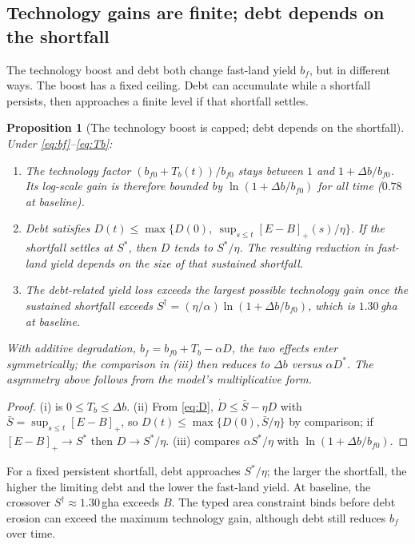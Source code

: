 \documentclass[preprint,12pt,authoryear]{elsarticle}
\newtheorem{proposition}{Proposition}
\newcommand{\pos}[1]{\left[#1\right]_+}
\begin{document}
\subsection{Technology gains are finite; debt depends on the shortfall}\label{sec:bounded}

The technology boost and debt both change fast-land yield $b_f$, but in different ways. The boost has a fixed ceiling. Debt can accumulate while a shortfall persists, then approaches a finite level if that shortfall settles.

\begin{proposition}[The technology boost is capped; debt depends on the shortfall]\label{prop:bounded}
Under \eqref{eq:bf}--\eqref{eq:Tb}:
\begin{enumerate}[label=(\roman*)]
\item The technology factor $(b_{f0}+T_b(t))/b_{f0}$ stays between $1$ and $1+\Delta b/b_{f0}$. Its log-scale gain is therefore bounded by $\ln(1+\Delta b/b_{f0})$ for all time ($0.78$ at baseline).
\item Debt satisfies $D(t)\le\max\{D(0),\ \sup_{s\le t}\pos{E-B}(s)/\eta\}$. If the shortfall settles at $S^*$, then $D$ tends to $S^*/\eta$. The resulting reduction in fast-land yield depends on the size of that sustained shortfall.
\item The debt-related yield loss exceeds the largest possible technology gain once the sustained shortfall exceeds $S^\dagger=(\eta/\alpha)\ln(1+\Delta b/b_{f0})$, which is $1.30$\,gha at baseline.
\end{enumerate}
With additive degradation, $b_f=b_{f0}+T_b-\alpha D$, the two effects enter symmetrically; the comparison in (iii) then reduces to $\Delta b$ versus $\alpha D^*$. The asymmetry above follows from the model's multiplicative form.
\end{proposition}

\begin{proof}
(i) is $0\le T_b\le\Delta b$. (ii) From \eqref{eq:D}, $\dot D\le\bar S-\eta D$ with $\bar S=\sup_{s\le t}\pos{E-B}$, so $D(t)\le\max\{D(0),\bar S/\eta\}$ by comparison; if $\pos{E-B}\to S^*$ then $D\to S^*/\eta$. (iii) compares $\alpha S^*/\eta$ with $\ln(1+\Delta b/b_{f0})$.
\end{proof}

For a fixed persistent shortfall, debt approaches $S^*/\eta$; the larger the shortfall, the higher the limiting debt and the lower the fast-land yield. At baseline, the crossover $S^\dagger\approx1.30$\,gha exceeds $B$. The typed area constraint binds before debt erosion can exceed the maximum technology gain, although debt still reduces $b_f$ over time.
\end{document}
